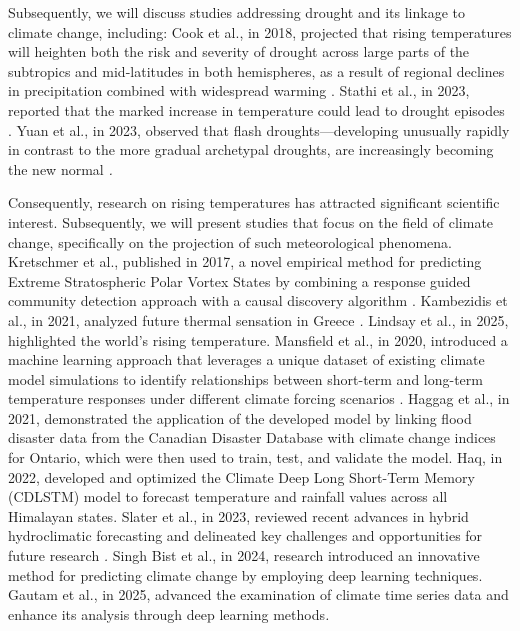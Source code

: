 \documentclass[12pt]{Definitions/academia}
\begin{document}
Subsequently, we will discuss studies addressing drought and its linkage
to climate change, including: Cook et al., in 2018, projected that
rising temperatures will heighten both the risk and severity of drought
across large parts of the subtropics and mid-latitudes in both hemispheres,
as a result of regional declines in precipitation combined with widespread
warming \textit{\cite{Cook 2018}}. Stathi et al., in 2023, reported
that the marked increase in temperature could lead to drought episodes
\textit{\cite{Stathi 2023}}. Yuan et al., in 2023, observed that
flash droughts---developing unusually rapidly in contrast to the
more gradual archetypal droughts, are increasingly becoming the new
normal \textit{\cite{Yuan 2023}.}

Consequently, research on rising temperatures has attracted significant
scientific interest. Subsequently, we will present studies that focus
on the field of climate change, specifically on the projection of
such meteorological phenomena. Kretschmer et al., published in 2017,
a novel empirical method for predicting Extreme Stratospheric Polar
Vortex States by combining a response guided community detection approach
with a causal discovery algorithm \textit{\cite{Kretschmer 2017}}.
Kambezidis et al., in 2021, analyzed future thermal sensation in Greece
\textit{\cite{Kambezidis 2021}.} Lindsay et al., in 2025, highlighted
the world's rising temperature\textit{\cite{Lindsey 2025}}. Mansfield
et al., in 2020, introduced a machine learning approach that leverages
a unique dataset of existing climate model simulations to identify
relationships between short-term and long-term temperature responses
under different climate forcing scenarios \textit{\cite{Mansfield 2020}}.
Haggag et al., in 2021, demonstrated the application of the developed
model by linking flood disaster data from the Canadian Disaster Database
with climate change indices for Ontario, which were then used to train,
test, and validate the model\textit{\cite{Haggag 2021}}. Haq, in
2022, developed and optimized the Climate Deep Long Short-Term Memory
(CDLSTM) model to forecast temperature and rainfall values across
all Himalayan states\textit{\cite{Haq 2022}}. Slater et al., in 2023,
reviewed recent advances in hybrid hydroclimatic forecasting and delineated
key challenges and opportunities for future research \textit{\cite{Slater 2023}.}
Singh Bist et al., in 2024, research introduced an innovative method
for predicting climate change by employing deep learning techniques\textit{\cite{Bist 2024}}.
Gautam et al., in 2025, advanced the examination of climate time series
data and enhance its analysis through deep learning methods\textit{\cite{GAUTAM 2025}. }
\end{document}
